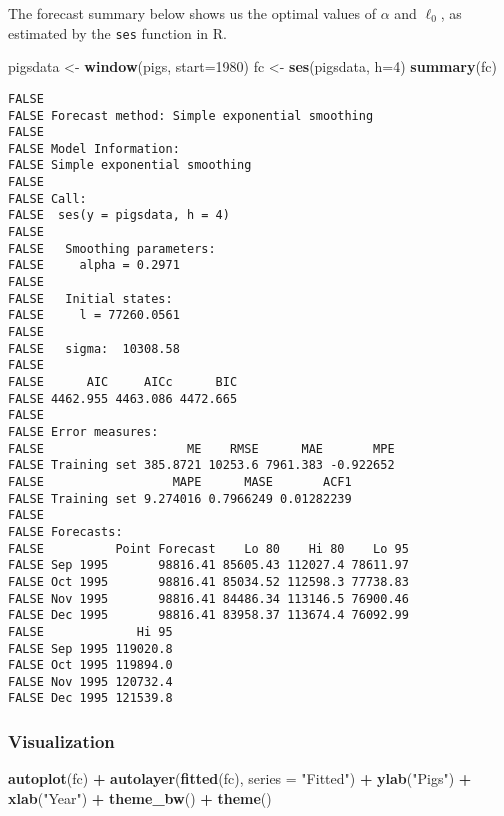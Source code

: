 \documentclass[openany]{book}
\newenvironment{Shaded}{\begin{snugshade}}{\end{snugshade}}
\newcommand{\DataTypeTok}[1]{\textcolor[rgb]{0.13,0.29,0.53}{#1}}
\newcommand{\DecValTok}[1]{\textcolor[rgb]{0.00,0.00,0.81}{#1}}
\newcommand{\KeywordTok}[1]{\textcolor[rgb]{0.13,0.29,0.53}{\textbf{#1}}}
\newcommand{\NormalTok}[1]{#1}
\newcommand{\OperatorTok}[1]{\textcolor[rgb]{0.81,0.36,0.00}{\textbf{#1}}}
\newcommand{\StringTok}[1]{\textcolor[rgb]{0.31,0.60,0.02}{#1}}
\begin{document}
The forecast summary below shows us the optimal values of \(\alpha\) and \(\ell_0\), as estimated by the \texttt{ses} function in R.

\begin{Shaded}
\begin{Highlighting}[]
\NormalTok{pigsdata <-}\StringTok{ }\KeywordTok{window}\NormalTok{(pigs, }\DataTypeTok{start=}\DecValTok{1980}\NormalTok{)}
\NormalTok{fc <-}\StringTok{ }\KeywordTok{ses}\NormalTok{(pigsdata, }\DataTypeTok{h=}\DecValTok{4}\NormalTok{)}
\KeywordTok{summary}\NormalTok{(fc) }
\end{Highlighting}
\end{Shaded}

\begin{verbatim}
FALSE 
FALSE Forecast method: Simple exponential smoothing
FALSE 
FALSE Model Information:
FALSE Simple exponential smoothing 
FALSE 
FALSE Call:
FALSE  ses(y = pigsdata, h = 4) 
FALSE 
FALSE   Smoothing parameters:
FALSE     alpha = 0.2971 
FALSE 
FALSE   Initial states:
FALSE     l = 77260.0561 
FALSE 
FALSE   sigma:  10308.58
FALSE 
FALSE      AIC     AICc      BIC 
FALSE 4462.955 4463.086 4472.665 
FALSE 
FALSE Error measures:
FALSE                    ME    RMSE      MAE       MPE
FALSE Training set 385.8721 10253.6 7961.383 -0.922652
FALSE                  MAPE      MASE       ACF1
FALSE Training set 9.274016 0.7966249 0.01282239
FALSE 
FALSE Forecasts:
FALSE          Point Forecast    Lo 80    Hi 80    Lo 95
FALSE Sep 1995       98816.41 85605.43 112027.4 78611.97
FALSE Oct 1995       98816.41 85034.52 112598.3 77738.83
FALSE Nov 1995       98816.41 84486.34 113146.5 76900.46
FALSE Dec 1995       98816.41 83958.37 113674.4 76092.99
FALSE             Hi 95
FALSE Sep 1995 119020.8
FALSE Oct 1995 119894.0
FALSE Nov 1995 120732.4
FALSE Dec 1995 121539.8
\end{verbatim}

\hypertarget{visualization}{%
\subsubsection{Visualization}\label{visualization}}

\begin{Shaded}
\begin{Highlighting}[]
\KeywordTok{autoplot}\NormalTok{(fc) }\OperatorTok{+}\StringTok{ }\KeywordTok{autolayer}\NormalTok{(}\KeywordTok{fitted}\NormalTok{(fc), }\DataTypeTok{series =} \StringTok{"Fitted"}\NormalTok{) }\OperatorTok{+}\StringTok{ }
\StringTok{  }\KeywordTok{ylab}\NormalTok{(}\StringTok{"Pigs"}\NormalTok{) }\OperatorTok{+}\StringTok{ }\KeywordTok{xlab}\NormalTok{(}\StringTok{"Year"}\NormalTok{) }\OperatorTok{+}\StringTok{ }\KeywordTok{theme_bw}\NormalTok{() }\OperatorTok{+}\StringTok{ }\KeywordTok{theme}\NormalTok{()}
\end{Highlighting}
\end{Shaded}
\end{document}
